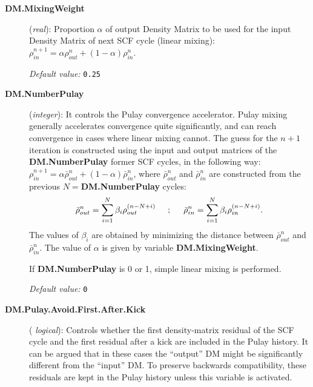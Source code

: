 \documentclass[11pt]{article}
\begin{document}
\begin{description}

\item[{\bf DM.MixingWeight}] ({\it real}):
Proportion $\alpha$ of
output Density Matrix to be used for the input Density Matrix of
next SCF cycle (linear mixing):
$\rho^{n+1}_{in} = \alpha \rho^{n}_{out}
+(1 - \alpha) \rho^{n}_{in}$.

{\it Default value:} {\tt 0.25}

\item[{\bf DM.NumberPulay}] ({\it integer}):
It controls the Pulay convergence accelerator. Pulay mixing generally
accelerates convergence quite significantly, and can
reach convergence in cases where linear mixing cannot.
The guess for the $n+1$ iteration is constructed using the
input and output matrices of the {\bf DM.NumberPulay} former
SCF cycles, in the following way:
$\rho^{n+1}_{in} = \alpha \bar{\rho}^{n}_{out}
+(1 - \alpha) \bar{\rho}^{n}_{in}$, where $\bar{\rho}^{n}_{out}$
and $\bar{\rho}^{n}_{in}$ are constructed from the previous
$N=${\bf DM.NumberPulay} cycles:
%
\begin{equation}
\bar{\rho}^{n}_{out} = \sum_{i=1}^N
\beta_i \rho_{out}^{(n-N+i)} \hspace{0.5truecm}; \hspace{0.5truecm}
\bar{\rho}^{n}_{in} = \sum_{i=1}^N
\beta_i \rho_{in}^{(n-N+i)}.
\nonumber
\end{equation}
%
The values of $\beta_i$ are obtained by minimizing the distance
between $\bar{\rho}^{n}_{out}$ and $\bar{\rho}^{n}_{in}$.
The value of $\alpha$ is given by variable {\bf DM.MixingWeight}.

If {\bf DM.NumberPulay} is 0 or 1, simple linear mixing is
performed.

{\it Default value:} {\tt 0}

\item[{\bf DM.Pulay.Avoid.First.After.Kick}] ({\it
  logical}):
   Controls
  whether the first density-matrix residual of the SCF cycle and the
  first residual after a kick are included in the Pulay history. It
  can be argued that in these cases the ``output'' DM might be
  significantly different from the ``input'' DM. To preserve backwards
  compatibility, these residuals are kept in the Pulay history unless
  this variable is activated.


\end{description}
\end{document}
